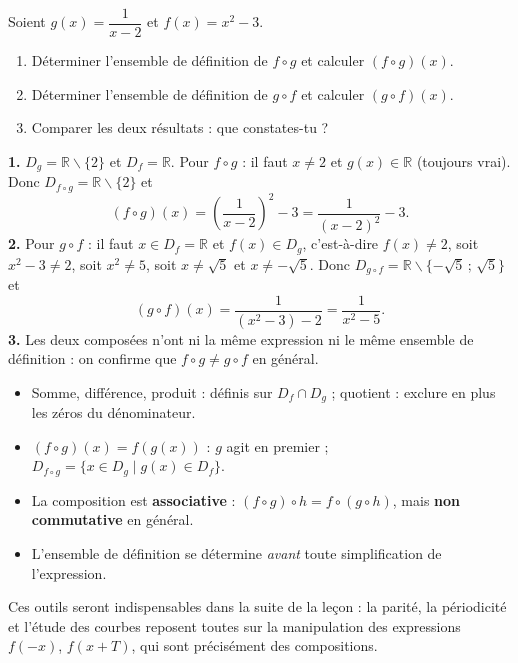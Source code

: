 \documentclass[11pt]{article}
\def\setminus{\mathbin{\backslash}}\let\smallsetminus\setminus
\begin{document}
\begin{exercice}
Soient $g(x) = \dfrac{1}{x-2}$ et $f(x) = x^2 - 3$.
\begin{enumerate}
\item Déterminer l'ensemble de définition de $f \circ g$ et calculer $(f \circ g)(x)$.
\item Déterminer l'ensemble de définition de $g \circ f$ et calculer $(g \circ f)(x)$.
\item Comparer les deux résultats : que constates-tu ?
\end{enumerate}
\end{exercice}

\begin{corrige}[Exercice 1]
\textbf{1.} $D_g = \mathbb{R} \setminus \{2\}$ et $D_f = \mathbb{R}$. Pour $f \circ g$ : il faut $x \neq 2$ et $g(x) \in \mathbb{R}$ (toujours vrai). Donc $D_{f \circ g} = \mathbb{R} \setminus \{2\}$ et
\[ (f \circ g)(x) = \left(\frac{1}{x-2}\right)^2 - 3 = \frac{1}{(x-2)^2} - 3. \]
\textbf{2.} Pour $g \circ f$ : il faut $x \in D_f = \mathbb{R}$ et $f(x) \in D_g$, c'est-à-dire $f(x) \neq 2$, soit $x^2 - 3 \neq 2$, soit $x^2 \neq 5$, soit $x \neq \sqrt{5}$ et $x \neq -\sqrt{5}$. Donc $D_{g \circ f} = \mathbb{R} \setminus \{-\sqrt{5}\,;\,\sqrt{5}\}$ et
\[ (g \circ f)(x) = \frac{1}{(x^2-3)-2} = \frac{1}{x^2-5}. \]
\textbf{3.} Les deux composées n'ont ni la même expression ni le même ensemble de définition : on confirme que $f \circ g \neq g \circ f$ en général.
\end{corrige}

\begin{aretenir}
\begin{itemize}
\item Somme, différence, produit : définis sur $D_f \cap D_g$ ; quotient : exclure en plus les zéros du dénominateur.
\item $(f \circ g)(x) = f(g(x))$ : $g$ agit en premier ; $D_{f \circ g} = \{x \in D_g \mid g(x) \in D_f\}$.
\item La composition est \textbf{associative} : $(f \circ g) \circ h = f \circ (g \circ h)$, mais \textbf{non commutative} en général.
\item L'ensemble de définition se détermine \emph{avant} toute simplification de l'expression.
\end{itemize}
Ces outils seront indispensables dans la suite de la leçon : la parité, la périodicité et l'étude des courbes reposent toutes sur la manipulation des expressions $f(-x)$, $f(x+T)$, qui sont précisément des compositions.
\end{aretenir}
\end{document}
